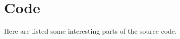 \newpage\cleardoublepage{}
\section{Code}

Here are listed some interesting parts of the source code.


